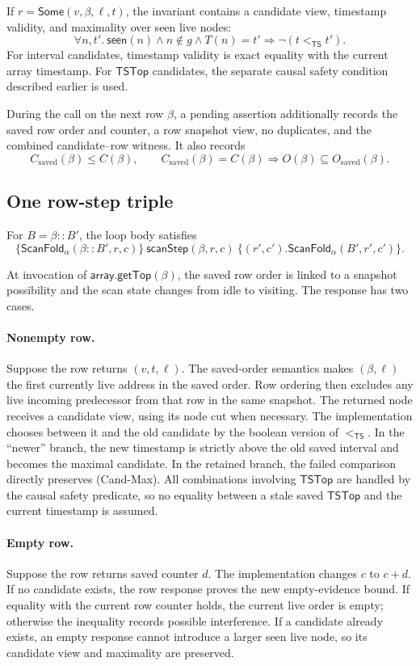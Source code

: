 \documentclass[11pt]{article}
\theoremstyle{definition}
\theoremstyle{remark}
\newcommand{\TS}{\mathsf{TS}}
\newcommand{\topts}{\mathsf{TSTop}}
\begin{document}
If \(r=\mathsf{Some}(v,\beta,\ell,t)\), the invariant contains a candidate
view, timestamp validity, and maximality over seen live nodes:
\[
  \forall n,t'.\ \mathsf{seen}(n)\land n\notin g\land T(n)=t'
  \Longrightarrow \neg(t<_{\TS}t').
\tag{Cand-Max}
\]
For interval candidates, timestamp validity is exact equality with the current
array timestamp.  For \(\topts\) candidates, the separate causal safety
condition described earlier is used.

During the call on the next row \(\beta\), a pending assertion additionally
records the saved row order and counter, a row snapshot view, no duplicates,
and the combined candidate--row witness.  It also records
\[
 C_{\mathrm{saved}}(\beta)\le C(\beta),
\qquad
C_{\mathrm{saved}}(\beta)=C(\beta)
 \Rightarrow O(\beta)\subseteq O_{\mathrm{saved}}(\beta).
\]

\subsection{One row-step triple}

For \(B=\beta::B'\), the loop body satisfies
\[
\boxed{
\{\mathsf{ScanFold}_\alpha(\beta::B',r,c)\}
\ \mathsf{scanStep}(\beta,r,c)\ 
\{(r',c').\mathsf{ScanFold}_\alpha(B',r',c')\}.
}
\]

At invocation of \(\mathsf{array.getTop}(\beta)\), the saved row order is
linked to a snapshot possibility and the scan state changes from idle to
visiting.  The response has two cases.

\paragraph{Nonempty row.}
Suppose the row returns \((v,t,\ell)\).  The saved-order semantics makes
\((\beta,\ell)\) the first currently live address in the saved order.  Row
ordering then excludes any live incoming predecessor from that row in the
same snapshot.  The returned node receives a candidate view, using its node
cut when necessary.  The implementation chooses between it and the old
candidate by the boolean version of \(<_{\TS}\).  In the ``newer'' branch,
the new timestamp is strictly above the old saved interval and becomes the
maximal candidate.  In the retained branch, the failed comparison directly
preserves \textup{(Cand-Max)}.  All combinations involving \(\topts\) are
handled by the causal safety predicate, so no equality between a stale saved
\(\topts\) and the current timestamp is assumed.

\paragraph{Empty row.}
Suppose the row returns saved counter \(d\).  The implementation changes
\(c\) to \(c+d\).  If no candidate exists, the row response proves the new
empty-evidence bound.  If equality with the current row counter holds, the
current live order is empty; otherwise the inequality records possible
interference.  If a candidate already exists, an empty response cannot
introduce a larger seen live node, so its candidate view and maximality are
preserved.
\end{document}
